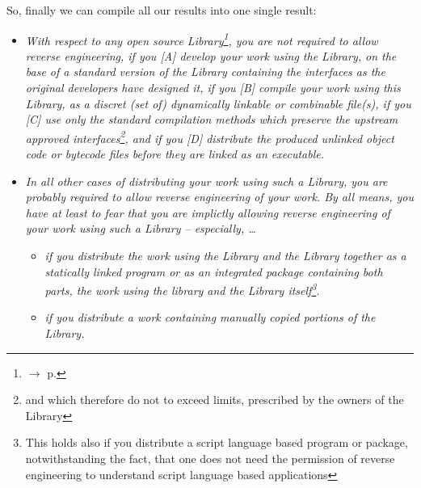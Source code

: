 %
%
%
%
%

So, finally we can compile all our results into one single result:

\begin{itemize}
  \item \emph{With respect to any open source Library\footnote{$\rightarrow$ p.
  \pageref{RevEngOslicOsLisences}}, you are not required to allow reverse
  engineering, if you [A] develop your work using the Library, on the base of a
  standard version of the Library containing the interfaces as the original
  developers have designed it, if you [B] compile your work using this Library,
  as a discret (set of) dynamically linkable or combinable file(s), if you [C]
  use only the standard compilation methods which preserve the upstream approved
  interfaces\footnote{and which therefore do not to exceed limits, prescribed by
  the owners of the Library}, and if you [D] distribute the produced unlinked
  object code or bytecode files before they are linked as an executable.}
  \item \emph{In all other cases of distributing your work using such a Library,
  you are probably required to allow reverse engineering of your work. By all
  means, you have at least to fear that you are implictly allowing reverse
  engineering of your work using such a Library -- especially, \ldots}
  \begin{itemize}
    \item \emph{if you distribute the work using the Library and the Library
    together as a statically linked program or as an integrated package
    containing both parts, the work using the library and the Library
    itself\footnote{This holds also if you distribute a script language based
    program or package, notwithstanding the fact, that one does not need the
    permission of reverse engineering to understand script language based
    applications}.}
    \item \emph{if you distribute a work containing manually copied portions of
    the Library.}
  \end{itemize}
\end{itemize}
 
